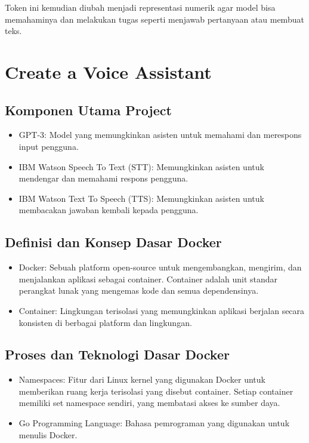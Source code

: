 \documentclass{article}
\begin{document}
Token ini kemudian diubah menjadi representasi numerik agar model bisa memahaminya dan melakukan tugas seperti menjawab pertanyaan atau membuat teks.



\newpage

\section{Create a Voice Assistant}
\subsection{Komponen Utama Project}
\begin{itemize}
    \item GPT-3: Model yang memungkinkan asisten untuk memahami dan merespons input pengguna.
    \item IBM Watson Speech To Text (STT): Memungkinkan asisten untuk mendengar dan memahami respons pengguna.
    \item IBM Watson Text To Speech (TTS): Memungkinkan asisten untuk membacakan jawaban kembali kepada pengguna.
\end{itemize}

\subsection{Definisi dan Konsep Dasar Docker}
\begin{itemize}
    \item Docker: Sebuah platform open-source untuk mengembangkan, mengirim, dan menjalankan aplikasi sebagai container. Container adalah unit standar perangkat lunak yang mengemas kode dan semua dependensinya.
    \item Container: Lingkungan terisolasi yang memungkinkan aplikasi berjalan secara konsisten di berbagai platform dan lingkungan.
\end{itemize}

\subsection{Proses dan Teknologi Dasar Docker}
\begin{itemize}
    \item Namespaces: Fitur dari Linux kernel yang digunakan Docker untuk memberikan ruang kerja terisolasi yang disebut container. Setiap container memiliki set namespace sendiri, yang membatasi akses ke sumber daya.
    \item Go Programming Language: Bahasa pemrograman yang digunakan untuk menulis Docker.
\end{itemize}
\end{document}
